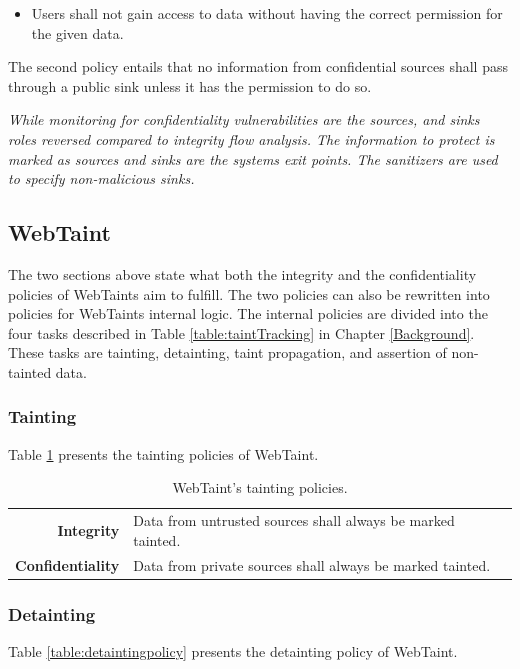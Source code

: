 \hfill
\begin{itemize}
    \item Users shall not gain access to data without having the correct permission for the given data.
\end{itemize}
\hfill

The second policy entails that no information from confidential sources shall pass through a public sink unless it has the permission to do so.

\textit{While monitoring for confidentiality vulnerabilities are the sources, and sinks roles reversed compared to integrity flow analysis. The information to protect is marked as sources and sinks are the systems exit points. The sanitizers are used to specify non-malicious sinks.}



\subsection{WebTaint}
The two sections above state what both the integrity and the confidentiality policies of WebTaints aim to fulfill. The two policies can also be rewritten into policies for WebTaints internal logic. The internal policies are divided into the four tasks described in Table \ref{table:taintTracking} in Chapter \ref{Background}. These tasks are tainting, detainting, taint propagation, and assertion of non-tainted data.



\subsubsection{Tainting}
Table \ref{table:taintingpolicy} presents the tainting policies of WebTaint.

\begin{table}[H]
    \centering
    \caption{WebTaint's tainting policies.}
    \label{table:taintingpolicy}
    \begin{tabular}{rp{8.5cm}}
        \textbf{Integrity} & Data from untrusted sources shall always be marked tainted. \\
        \textbf{Confidentiality} & Data from private sources shall always be marked tainted. \\         
    \end{tabular}
\end{table}



\subsubsection{Detainting}
Table \ref{table:detaintingpolicy} presents the detainting policy of WebTaint.

